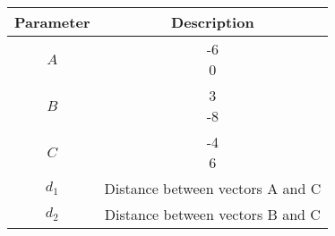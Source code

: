 \begin{tabular}{|c|c|}
        \hline
        Parameter & Description\\
        \hline
        $A$ & \myvec{-6\\0}\\
        \hline
        $B$ & \myvec{3\\-8}\\
        \hline
        $C$ & \myvec{-4\\6}\\
        \hline
        $d_1$ & Distance between vectors A and C\\
        \hline
        $d_2$ & Distance between vectors B and C\\
        \hline
\end{tabular}
